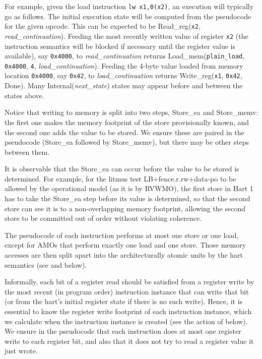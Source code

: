 \begin{commentary}
For example, given the load instruction \verb!lw x1,0(x2)!,
an execution will typically go as follows.
The initial execution state will be computed from the pseudocode for the given opcode.
This can be expected to be {\sc Read\_reg}({\tt x2}, {\it read\_continuation}).
Feeding the most recently written value of register {\tt x2} (the instruction semantics will be blocked if necessary until the register value is available), say {\tt 0x4000}, to {\it read\_continuation} returns {\sc Load\_mem}({\tt plain\_load}, {\tt 0x4000}, {\tt 4}, {\it load\_continuation}).
Feeding the 4-byte value loaded from memory location {\tt 0x4000}, say {\tt 0x42}, to {\it load\_continuation} returns
{\sc Write\_reg}({\tt x1}, {\tt 0x42}, {\sc Done}).
Many {\sc Internal}({\it next\_state}) states may appear before and between the states above.
\end{commentary}

Notice that writing to memory is split into two steps, {\sc Store\_ea} and {\sc Store\_memv}: the first one makes the memory footprint of the store provisionally known, and the second one adds the value to be stored.
We ensure these are paired in the pseudocode ({\sc Store\_ea} followed by {\sc Store\_memv}), but there may be other steps between them.
\begin{commentary}
It is observable that the {\sc Store\_ea} can occur before the value to be stored is determined.
For example, for the litmus test LB+fence.r.rw+data-po to be allowed by the operational model (as it is by RVWMO), the first store in Hart 1 has to take the {\sc Store\_ea} step before its value is determined, so that the second store can see it is to a non-overlapping memory footprint, allowing the second store to be committed out of order without violating coherence.
\end{commentary}

The pseudocode of each instruction performs at most one store or one load, except for AMOs that perform exactly one load and one store.
Those memory accesses are then split apart into the architecturally atomic units by the hart semantics (see  and  below).

Informally, each bit of a register read should be satisfied from a register write by the most recent (in program order) instruction instance that can write that bit (or from the hart's initial register state if there is no such write).
Hence, it is essential to know the register write footprint of each instruction instance, which we calculate when the instruction instance is created (see the action of  below).
We ensure in the pseudocode that each instruction does at most one register write to each register bit, and also that it does not try to read a register value it just wrote.

